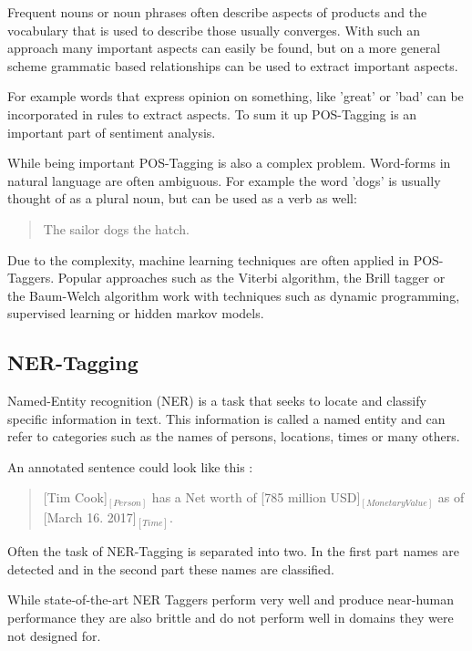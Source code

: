 \documentclass[10pt,a4paper]{article}
\begin{document}
		Frequent nouns or noun phrases often describe aspects of products and the vocabulary that is used to describe those usually converges. With such an approach many important aspects can easily be found, but on a more general scheme grammatic based relationships can be used to extract important aspects.

		For example words that express opinion on something, like 'great' or 'bad' can be incorporated in rules to extract aspects. To sum it up POS-Tagging is an important part of sentiment analysis.
		
		While being important POS-Tagging is also a complex problem. Word-forms in natural language are often ambiguous. For example the word 'dogs' is usually thought of as a plural noun, but can be used as a verb as well:

		\begin{quote}
			The sailor dogs the hatch.
		\end{quote}

		Due to the complexity, machine learning techniques are often applied in POS-Taggers. Popular approaches such as the Viterbi algorithm, the Brill tagger or the Baum-Welch algorithm work with techniques such as dynamic programming, supervised learning or hidden markov models.
		
		\subsection{NER-Tagging}
		
		Named-Entity recognition (NER) is a task that seeks to locate and classify specific information in text. This information is called a named entity and can refer to categories such as the names of persons, locations, times or many others.

		An annotated sentence could look like this :

		\begin{quote}
			[Tim Cook]$_{[Person]}$ has a Net worth of [785 million USD]$_{[Monetary Value]}$ as of [March 16. 2017]$_{[Time]}$.
		\end{quote}
		
		Often the task of NER-Tagging is separated into two. In the first part names are detected and in the second part these names are classified. 
		
		While state-of-the-art NER Taggers perform very well and produce near-human performance they are also brittle and do not perform well in domains they were not designed for.
\end{document}
